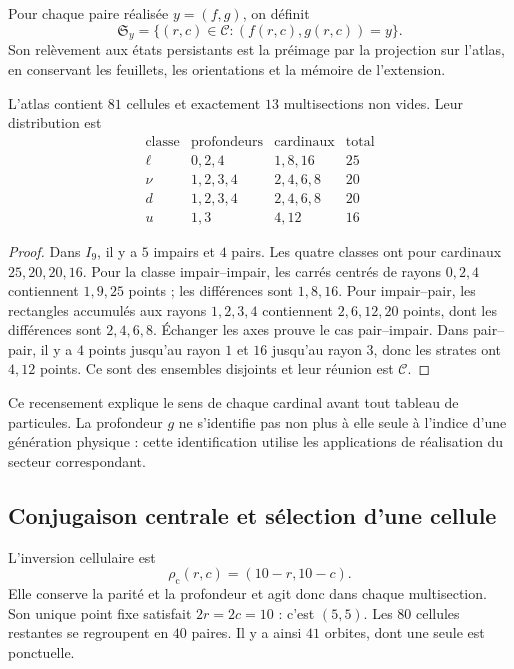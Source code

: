 

\begin{definition}
Pour chaque paire réalisée \(y=(f,g)\), on définit
\[
 \mathfrak S_y=\{(r,c)\in\mathcal C:(f(r,c),g(r,c))=y\}.
\]
Son relèvement aux états persistants est la préimage par la projection
sur l’atlas, en conservant les feuillets, les orientations et la mémoire de l’extension.
\end{definition}

\begin{proposition}
\label{vi:vi:prop:censo13}
L’atlas contient \(81\) cellules et exactement \(13\) multisections non vides.
Leur distribution est
\[
\begin{array}{c|c|c|r}
\text{classe}&\text{profondeurs}&\text{cardinaux}&\text{total}\\\hline
\ell&0,2,4&1,8,16&25\\
\nu&1,2,3,4&2,4,6,8&20\\
d&1,2,3,4&2,4,6,8&20\\
u&1,3&4,12&16
\end{array}
\]
\end{proposition}
\begin{proof}
Dans \(I_9\), il y a \(5\) impairs et \(4\) pairs. Les quatre classes ont pour
cardinaux \(25,20,20,16\). Pour la classe impair--impair, les carrés
centrés de rayons \(0,2,4\) contiennent \(1,9,25\) points ; les
différences sont \(1,8,16\). Pour impair--pair, les rectangles accumulés
aux rayons \(1,2,3,4\) contiennent \(2,6,12,20\) points, dont les
différences sont \(2,4,6,8\). Échanger les axes prouve le cas
pair--impair. Dans pair--pair, il y a \(4\) points jusqu’au rayon \(1\) et \(16\)
jusqu’au rayon \(3\), donc les strates ont \(4,12\) points.
Ce sont des ensembles disjoints et leur réunion est \(\mathcal C\).
\end{proof}

Ce recensement explique le sens de chaque cardinal avant tout tableau
de particules. La profondeur \(g\) ne s’identifie pas non plus à elle seule à
l’indice d’une génération physique : cette identification utilise les applications
de réalisation du secteur correspondant.

\subsection{Conjugaison centrale et sélection d’une cellule}

L’inversion cellulaire est
\[
 \rho_{\mathrm c}(r,c)=(10-r,10-c).
\]
Elle conserve la parité et la profondeur et agit donc dans chaque
multisection. Son unique point fixe satisfait \(2r=2c=10\) : c’est \((5,5)\).
Les \(80\) cellules restantes se regroupent en \(40\) paires. Il y a ainsi
\(41\) orbites, dont une seule est ponctuelle.

